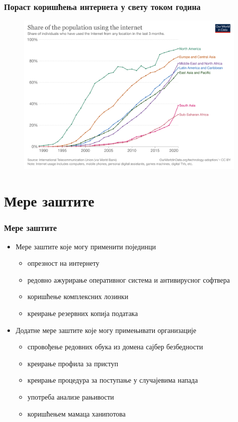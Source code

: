 \documentclass{beamer}
\begin{document}
\begin{frame}\frametitle{Пораст коришћења интернета у свету током година}
  \begin{figure}[h]
  \centering
  \includegraphics[width=1.0\textwidth]{koriscenje-interneta-po-godinama.png}
  \end{figure}
\end{frame}

\section{Мере заштите}

\begin{frame}[fragile]\frametitle{Мере заштите}
	\begin{itemize}	
	\item Мере заштите које могу применити појединци
		\begin{itemize}
		\item опрезност на интернету
		\item редовно ажурирање оперативног система и антивирусног софтвера
		\item коришћење комплексних лозинки
		\item креирање резервних копија података
	\end{itemize}
	\item Додатне мере заштите које могу примењивати организације
	\begin{itemize}
		\item спровођење редовних обука из домена сајбер безбедности 
		\item креирање профила за приступ
		\item креирање процедура за поступање у случајевима напада
		\item употреба анализе рањивости
		\item коришћењем мамаца ханипотова
	\end{itemize}
	\end{itemize}
\end{frame}
\end{document}
